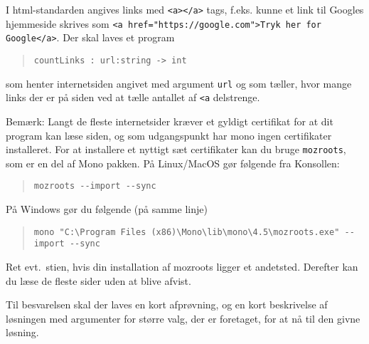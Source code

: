I html-standarden angives links med \lstinline!<a></a>! tags, f.eks. kunne et link til Googles hjemmeside skrives som \lstinline!<a href="https://google.com">Tryk her for Google</a>!. Der skal laves et program
  \begin{quote}
    \mbox{\lstinline!countLinks : url:string -> int!}
  \end{quote}
  som henter internetsiden angivet med argument \lstinline!url! og som tæller, hvor mange links der er på siden ved at tælle antallet af \lstinline!<a! delstrenge.

  Bemærk: Langt de fleste internetsider kræver et gyldigt certifikat for at dit program kan læse siden, og som udgangspunkt har mono ingen certifikater installeret. For at installere et nyttigt sæt certifikater kan du bruge \lstinline[language=console]{mozroots}, som er en del af Mono pakken. På Linux/MacOS gør følgende fra Konsollen:
  \begin{quote}
    \lstinline[language=console]{mozroots --import --sync}
  \end{quote}
  På Windows gør du følgende (på samme linje)
  \begin{quote}
    \lstinline[language=console]{mono "C:\Program Files (x86)\Mono\lib\mono\4.5\mozroots.exe" --import --sync}
  \end{quote}
  Ret evt.\ stien, hvis din installation af mozroots ligger et andetsted. Derefter kan du læse de fleste sider uden at blive afvist.

  Til besvarelsen skal der laves en kort afprøvning, og en kort beskrivelse af løsningen med argumenter for større valg, der er foretaget, for at nå til den givne løsning.
